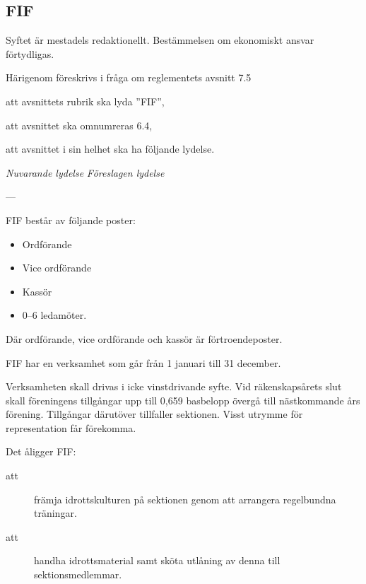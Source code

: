 \documentclass{article}
\newenvironment{lydelse}
    {\begin{paracol}{2}%
        \emph{Nuvarande lydelse}%
        \switchcolumn%
        \emph{Föreslagen lydelse}%
    \end{paracol}%
    \begin{enumerate}[label=\thesubsection.\arabic*]%
    \begin{paracol}{2}%
    }{\end{paracol}\end{enumerate}}
\begin{document}
\subsection{FIF}
Syftet är mestadels redaktionellt.
Bestämmelsen om ekonomiskt ansvar förtydligas.

Härigenom föreskrivs i fråga om reglementets avsnitt 7.5

\begin{dels}
    \item att avsnittets rubrik ska lyda ''FIF'',
    \item att avsnittet ska omnumreras 6.4,
    \item att avsnittet i sin helhet ska ha följande lydelse.
\end{dels}

\begin{lydelse}

    \setcounter{section}{7}
    \setcounter{subsection}{5}
    
    
    \item[] ---
    
    \item FIF består av följande poster:
    \begin{itemize}
    	\item Ordförande
    	\item Vice ordförande
    	\item Kassör
    	\item 0--6 ledamöter.
    \end{itemize}
    Där ordförande, vice ordförande och kassör är förtroendeposter.
    
    \vspace{1.2em}
    \item FIF har en verksamhet som går från 1 januari till 31 december.

	\item Verksamheten skall drivas i icke vinstdrivande syfte. Vid räkenskapsårets slut skall föreningens tillgångar upp till 0,659 basbelopp övergå till nästkommande års förening. Tillgångar därutöver tillfaller sektionen. Visst utrymme för representation får förekomma.
    
    \item Det åligger FIF:
	\begin{description}
		\item[att] främja idrottskulturen på sektionen genom att arrangera regelbundna träningar.
		\item[att] handha idrottsmaterial samt sköta utlåning av denna till sektionsmedlemmar.
	\end{description}


\end{lydelse}
\end{document}

